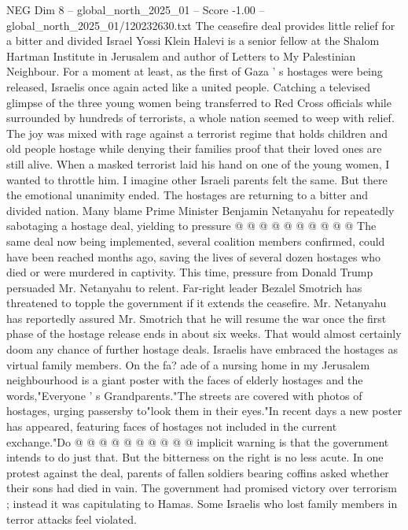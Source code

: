 \begin{textsample}{NEG Dim 8 – global\_north\_2025\_01 – Score -1.00 – global\_north\_2025\_01/120232630.txt}  \label{ex:f8_neg_344}
The ceasefire deal provides little relief for a bitter and divided Israel Yossi Klein Halevi is a senior fellow at the Shalom Hartman Institute in Jerusalem and author of Letters to My Palestinian Neighbour.
For a moment at least, as the first of Gaza ' s hostages were being released, Israelis once again acted like a united people.
Catching a televised glimpse of the three young women being transferred to Red Cross officials while surrounded by hundreds of terrorists, a whole nation seemed to weep with relief.
The joy was mixed with rage against a terrorist regime that holds children and old people hostage while denying their families proof that their loved ones are still alive.
When a masked terrorist laid his hand on one of the young women, I wanted to throttle him.
I imagine other Israeli parents felt the same.
But there the emotional unanimity ended.
The hostages are returning to a bitter and divided nation.
Many blame Prime Minister Benjamin Netanyahu for repeatedly sabotaging a hostage deal, yielding to pressure @ @ @ @ @ @ @ @ @ @ The same deal now being implemented, several coalition members confirmed, could have been reached months ago, saving the lives of several dozen hostages who died or were murdered in captivity.
This time, pressure from Donald Trump persuaded Mr.
Netanyahu to relent.
Far-right leader Bezalel Smotrich has threatened to topple the government if it extends the ceasefire.
Mr.
Netanyahu has reportedly assured Mr.
Smotrich that he will resume the war once the first phase of the hostage release ends in about six weeks.
That would almost certainly doom any chance of further hostage deals.
Israelis have embraced the hostages as virtual family members.
On the fa? ade of a nursing home in my Jerusalem neighbourhood is a giant poster with the faces of elderly hostages and the words,"Everyone ' s Grandparents."The streets are covered with photos of hostages, urging passersby to"look them in their eyes."In recent days a new poster has appeared, featuring faces of hostages not included in the current exchange."Do @ @ @ @ @ @ @ @ @ @ implicit warning is that the government intends to do just that.
But the bitterness on the right is no less acute.
In one protest against the deal, parents of fallen soldiers bearing coffins asked whether their sons had died in vain.
The government had promised victory over terrorism ; instead it was capitulating to Hamas.
Some Israelis who lost family members in terror attacks feel violated.

\end{textsample}
